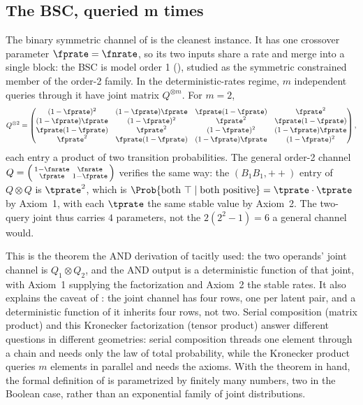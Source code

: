 \subsection*{The BSC, queried m times}

The binary symmetric channel of  is the cleanest instance. It has
one crossover parameter $\fprate = \fnrate$, so its two inputs share a rate and
merge into a single block: the BSC is model order 1 (),
studied as the symmetric constrained member of the order-2 family. In the
deterministic-rates regime, $m$ independent queries through it have joint matrix
$Q^{\otimes m}$. For $m = 2$,
\[
  Q^{\otimes 2} =
  \begin{pmatrix}
    (1-\fprate)^2 & (1-\fprate)\fprate & \fprate(1-\fprate) & \fprate^2 \\
    (1-\fprate)\fprate & (1-\fprate)^2 & \fprate^2 & \fprate(1-\fprate) \\
    \fprate(1-\fprate) & \fprate^2 & (1-\fprate)^2 & (1-\fprate)\fprate \\
    \fprate^2 & \fprate(1-\fprate) & (1-\fprate)\fprate & (1-\fprate)^2
  \end{pmatrix},
\]
each entry a product of two transition probabilities. The general order-2
channel $Q = \left(\begin{smallmatrix} 1-\fnrate & \fnrate \\ \fprate & 1-\fprate
\end{smallmatrix}\right)$ verifies the same way: the $(B_1 B_1, {++})$ entry of
$Q \otimes Q$ is $\tprate^2$, which is $\Prob{\text{both } \top \mid \text{both
positive}} = \tprate \cdot \tprate$ by Axiom~1, with each $\tprate$ the same
stable value by Axiom~2. The two-query joint thus carries $4$ parameters, not
the $2(2^2 - 1) = 6$ a general channel would.

This is the theorem the AND derivation of  tacitly
used: the two operands' joint channel is $Q_1 \otimes Q_2$, and the AND output
is a deterministic function of that joint, with Axiom~1 supplying the
factorization and Axiom~2 the stable rates. It also explains the caveat of
: the joint channel has four rows, one per latent
pair, and a deterministic function of it inherits four rows, not two. Serial
composition (matrix product) and this Kronecker factorization (tensor product)
answer different questions in different geometries: serial composition threads
one element through a chain and needs only the law of total probability, while
the Kronecker product queries $m$ elements in parallel and needs the axioms. With the theorem in hand, the formal definition of
 is parametrized by finitely many numbers, two
in the Boolean case, rather than an exponential family of joint distributions.
